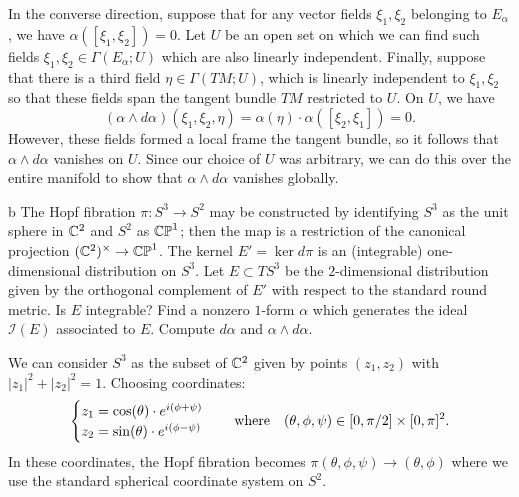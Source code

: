 \documentclass{../../templates/lkx_pset}
\begin{document}
\begin{parts}
	In the converse direction, suppose that for any vector fields $\xi_1,\xi_2$ belonging to $E_\alpha$, we have $\alpha([\xi_1,\xi_2])=0$. Let $U$ be an open set on which we can find such fields $\xi_1, \xi_2 \in \Gamma(E_\alpha; U)$ which are also linearly independent. Finally, suppose that there is a third field $\eta \in \Gamma(TM; U)$, which is linearly independent to $\xi_1, \xi_2$ so that these fields span the tangent bundle $TM$ restricted to $U$. On $U$, we have
	\[
		(\alpha\wedge d\alpha)(\xi_1, \xi_2,\eta) = \alpha(\eta)\cdot \alpha([\xi_2, \xi_1]) = 0.
	\]
	However, these fields formed a local frame the tangent bundle, so it follows that $\alpha\wedge d\alpha$ vanishes on $U$. Since our choice of $U$ was arbitrary, we can do this over the entire manifold to show that $\alpha\wedge d\alpha$ vanishes globally.

	\begin{part}{b}
		The Hopf fibration $\pi : S^3 \to S^2$ may be constructed by identifying $S^3$ as the unit sphere in $\mathbb{C}^2$ and $S^2$ as $\mathbb{CP}^1$; then the map is a restriction of the canonical projection $(\mathbb{C}^2)^\times \to \mathbb{CP}^1$. The kernel $E' = \ker d\pi$ is an (integrable) one-dimensional distribution on $S^3$. Let $E\subset TS^3$ be the $2$-dimensional distribution given by the orthogonal complement of $E'$ with respect to the standard round metric. Is $E$ integrable? Find a nonzero $1$-form $\alpha$ which generates the ideal $\mathcal{I}(E)$ associated to $E$. Compute $d\alpha$ and $\alpha\wedge d\alpha$.
	\end{part}

	We can consider $S^3$ as the subset of $\mathbb{C}^2$ given by points $(z_1, z_2)$ with $|z_1|^2 + |z_2|^2=1$. Choosing coordinates:
	\[
		\begin{cases} z_1 = \cos(\theta)\cdot e^{i(\phi + \psi)} \\ z_2 = \sin(\theta)\cdot e^{i(\phi - \psi)} \end{cases} \quad\textrm{where}\quad (\theta,\phi,\psi)\in [0,\pi/2]\times[0,\pi]^2.
	\]
	In these coordinates, the Hopf fibration becomes $\pi(\theta,\phi,\psi) \to (\theta,\phi)$ where we use the standard spherical coordinate system on $S^2$. 


\end{parts}
\end{document}
